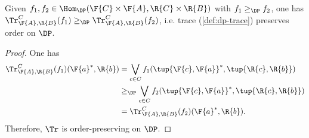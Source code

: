 \begin{lemma}
Given $f_1,f_2\in \Hom_\DP(\F{C}\times \F{A},\R{C}\times \R{B})$ with $f_1\geq_\DP f_2$, one has $\Tr_{\F{A},\R{B}}^C(f_1)\geq_\DP \Tr_{\F{A},\R{B}}^C(f_2)$, i.e. trace (\cref{def:dp-trace}) preserves order on $\DP$.
\end{lemma}

\begin{proof}
One has
\begin{equation}
    \begin{aligned}
    \Tr_{\F{A},\R{B}}^C(f_1)(\F{a}^*,\R{b})&=\bigvee_{c\in C}f_1(\tup{\F{c},\F{a}}^*,\tup{\R{c},\R{b}})\\
    &\geq_\DP \bigvee_{c\in C}f_2(\tup{\F{c},\F{a}}^*,\tup{\R{c},\R{b}})\\
    &=\Tr_{\F{A},\R{B}}^C(f_2)(\F{a}^*,\R{b}).
    \end{aligned}
\end{equation}
Therefore, $\Tr$ is order-preserving on $\DP$.
\end{proof}
